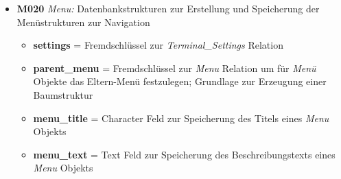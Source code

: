 \begin{itemize}
    \item \textbf{M020} \textit{Menu:} Datenbankstrukturen zur Erstellung und Speicherung der Menüstrukturen zur Navigation
    \begin{itemize}
        \item \textbf{settings} = Fremdschlüssel zur \textit{Terminal\_Settings} Relation
        \item \textbf{parent\_menu} = Fremdschlüssel zur \textit{Menu} Relation um für \textit{Menü} Objekte das Eltern-Menü festzulegen; Grundlage zur Erzeugung einer Baumstruktur
        \item \textbf{menu\_title} = Character Feld zur Speicherung des Titels eines \textit{Menu} Objekts
        \item \textbf{menu\_text} = Text Feld zur Speicherung des Beschreibungstexts eines \textit{Menu} Objekts
    \end{itemize}
\end{itemize}
\vspace{0,5cm}
